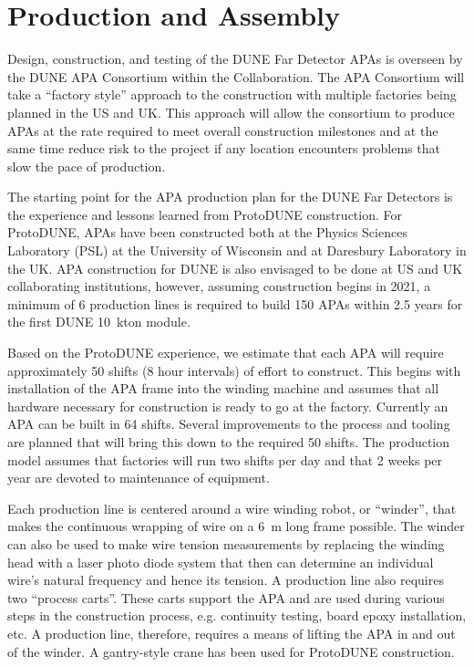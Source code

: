 \section{Production and Assembly} %
\label{sec:fdsp-apa-prod-assy}

Design, construction, and testing of the DUNE Far Detector APAs is overseen by the DUNE APA Consortium within the Collaboration.  The APA Consortium will take a ``factory style'' approach to the construction with multiple factories being planned in the US and UK. This approach will allow the consortium to produce APAs at the rate required to meet overall construction milestones and at the same time reduce risk to the project if any location encounters problems that slow the pace of production.


The starting point for the APA production plan for the DUNE Far Detectors is the experience and lessons learned from ProtoDUNE construction. For ProtoDUNE, APAs have been constructed both at the Physics Sciences Laboratory (PSL) at the University of Wisconsin and at Daresbury Laboratory in the UK.  APA construction for DUNE is also envisaged to be done at US and UK collaborating institutions, however, assuming construction begins in 2021, a minimum of 6 production lines is required to build 150 APAs within 2.5 years for the first DUNE \SI{10}{kton} module.   

Based on the ProtoDUNE experience, we estimate that each APA will require approximately 50 shifts (8 hour intervals) of effort to construct. This begins with installation of the APA frame into the winding machine and assumes that all hardware necessary for construction is ready to go at the factory. Currently an APA can be built in 64 shifts. Several improvements to the process and tooling are planned that will bring this down to the required 50 shifts. The production model assumes that factories will run two shifts per day and that 2 weeks per year are devoted to maintenance of equipment. 

Each production line is centered around a wire winding robot, or ``winder'', that makes the continuous wrapping of wire on a \SI{6}{m} long frame possible. The winder can also be used to make wire tension measurements by replacing the winding head with a laser photo diode system that then can determine an individual wire's natural frequency and hence its tension. A production line also requires two ``process carts''. These carts support the APA and are used during various steps in the construction process, e.g. continuity testing, board epoxy installation, etc. A production line, therefore, requires a means of lifting the APA in and out of the winder. A gantry-style crane has been used for ProtoDUNE construction.

